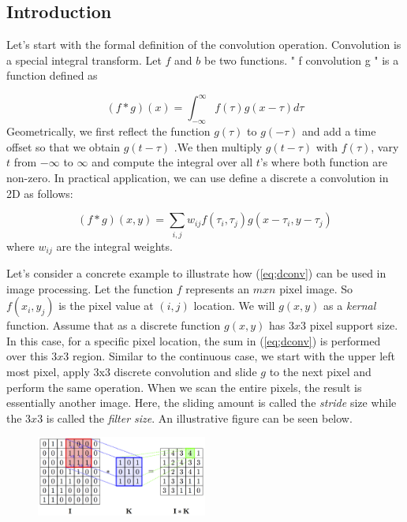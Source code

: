 \documentclass[12pt]{article}
\begin{document}
\subsection*{Introduction}
\label{introCNN}
Let's start with the formal definition of the convolution operation. Convolution is a special integral transform. Let $f$ and $b$ be two functions. " f convolution g " is a function defined as

\begin{equation}
\label{eq;conv}
(f*g)(x) = \int_{-\infty}^{\infty} f(\tau)g(x-\tau)d\tau
\end{equation}
Geometrically, we first reflect the function $g(\tau)$ to $g(-\tau)$ and add a time offset so that we obtain $g(t-\tau)$ .We then multiply $g(t-\tau)$ with $f(\tau)$, vary $t$ from $-\infty$ to $\infty$ and compute the integral over all $t$'s where both function are non-zero. In practical application, we can use define a discrete a convolution in 2D as follows:

\begin{equation}
\label{eq;dconv}
(f*g)(x,y) = \sum_{i,j} w_{ij}f(\tau_{i},\tau_{j})g(x-\tau_{i},y-\tau_{j})
\end{equation}
where $w_{ij}$ are the integral weights.

Let's consider a concrete example to illustrate how (\ref{eq;dconv}) can be used in image processing. Let the function $f$ represents an $mxn$ pixel image. So $f(x_{i},y_{j})$  is the pixel value at $(i,j)$ location. We will $g(x,y)$ as a \textit{kernal} function. Assume that as a discrete function $g(x,y)$ has $3x3$ pixel support size. In this case, for a specific pixel location,  the sum in (\ref{eq;dconv}) is performed over this $3x3$ region. Similar to the continuous case, we start with the upper left most pixel, apply 3x3 discrete convolution and slide $g$ to the next pixel and perform the same operation. When we scan the entire pixels, the result is essentially another image. Here, the sliding amount is called the \textit{stride} size while the $3x3$ is called the \textit{filter size}. An illustrative figure can be seen below.

 \begin{figure}[H]
 \label{pic:conv}
  \centering
  \includegraphics[width=0.5\textwidth]{conv.png}
\end{figure}
\end{document}
